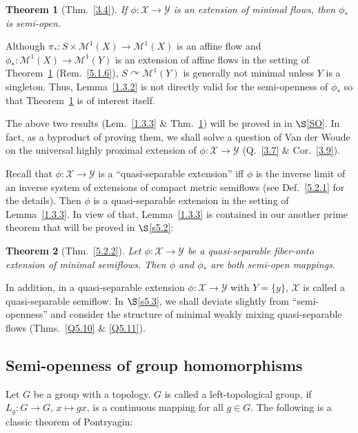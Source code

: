 \documentclass[12pt,final,3p,times]{elsarticle}
\newtheorem{sthm}{Theorem}[subsection]
\theoremstyle{definition}
\numberwithin{equation}{section}
\begin{document}
\begin{sthm}[Thm.~\ref{3.4}]\label{1.3.4}
If $\phi\colon \mathscr{X}\rightarrow \mathscr{Y}$ is an extension of minimal flows, then $\phi_*$ is semi-open.
\end{sthm}

\noindent Although $\pi_*\colon S\times\mathcal{M}^1(X)\rightarrow\mathcal{M}^1(X)$ is an affine flow and $\phi_*\colon\mathcal{M}^1(X)\rightarrow\mathcal{M}^1(Y)$ is an extension of affine flows in the setting of Theorem~\ref{1.3.4} (Rem.~\ref{5.1.6}), $S\curvearrowright\mathcal{M}^1(Y)$ is generally not minimal unless $Y$ is a singleton. Thus, Lemma~\ref{1.3.2} is not directly valid for the semi-openness of $\phi_*$ so that Theorem~\ref{1.3.4} is of interest itself.

The above two results (Lem.~\ref{1.3.3} $\&$ Thm.~\ref{1.3.4}) will be proved in in $\S$\ref{SO}. In fact, as a byproduct of proving them, we shall solve a question of Van der Woude \cite[Q.~IV.6.4b]{Wo} on the universal highly proximal extension of $\phi\colon \mathscr{X}\rightarrow \mathscr{Y}$ (Q.~\ref{3.7} $\&$ Cor.~\ref{3.9}).

Recall that $\phi\colon\mathscr{X}\rightarrow\mathscr{Y}$ is a ``quasi-separable extension'' iff $\phi$ is the inverse limit of an inverse system of extensions of compact metric semiflows (see Def.~\ref{5.2.1} for the details). Then $\phi$ is a quasi-separable extension in the setting of Lemma~\ref{1.3.3}. In view of that, Lemma~\ref{1.3.3} is contained in our another prime theorem that will be proved in $\S$\ref{s5.2}:

\begin{sthm}[Thm.~\ref{5.2.2}]\label{1.3.5}
 Let $\phi\colon\mathscr{X}\rightarrow\mathscr{Y}$ be a quasi-separable fiber-onto extension of minimal semiflows. Then $\phi$ and $\phi_*$ are both semi-open mappings.
\end{sthm}

In addition, in a quasi-separable extension $\phi\colon\mathscr{X}\rightarrow\mathscr{Y}$ with $Y=\{y\}$, $\mathscr{X}$ is called a quasi-separable semiflow.
In $\S$\ref{s5.3}, we shall deviate slightly from ``semi-openness'' and consider the structure of minimal weakly mixing quasi-separable flows (Thms.~\ref{Q5.10} $\&$ \ref{Q5.11}).

\subsection{Semi-openness of group homomorphisms}\label{s1.4}
Let $G$ be a group with a topology. $G$ is called a left-topological group, if $L_g\colon G\rightarrow G$, $x\mapsto gx$, is a continuous mapping for all $g\in G$. The following is a classic theorem of Pontryagin: 
\end{document}
